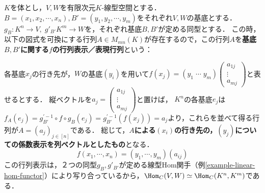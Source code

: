 \documentclass[uplatex, dvipdfmx]{jsreport}
\begin{document}
\begin{definition}
    $K$を体とし，$V,W$を有限次元$K$-線型空間とする．$B=(x_1,x_2,\cdots,x_n), B'=(y_1,y_2,\cdots,y_m)$をそれぞれ$V,W$の基底とする．$g_B:K^n\longrightarrow V,\; g'_{B'}K^m\longrightarrow W$を，それぞれ基底$B,B'$が定める同型とする．
    この時，以下の図式を可換にする行列$A\in M_{mn}(K)$が存在するので，この行列$A$を\textbf{基底$B,B'$に関する$f$の行列表示／表現行列}という：
    \begin{center}\end{center}
\end{definition}
\begin{remarks}[行列表示は列ベクトルでみる]
    各基底$x_j$の行き先が，$W$の基底$(y_i)$を用いて$f(x_j)=(y_1\;\cdots\;y_m)\begin{pmatrix}a_{1j}\\\vdots\\a_{mj}\end{pmatrix}$と表せるとする．
    縦ベクトルを$a_j=\begin{pmatrix}a_{1j}\\\vdots\\a_{mj}\end{pmatrix}$と置けば，
    $K^n$の各基底$e_j$は$f_A(e_j)=g^{'-1}_{B'}\circ f\circ g_B(e_j)=g^{'-1}_{B'}(f(x_j))=a_j$より，これらを並べて得る行列が$A=(a_j)_{j\in[n]}$である．
    総じて，\textbf{$A$による$(x_i)$の行き先の，$(y_j)$についての係数表示を列ベクトルとしたもの}となる．
    \[f(x_1,\cdots,x_n)=(y_1,\cdots,y_m)(a_{ij})\]
    この行列表示は，２つの同型$g_B,g'_{B'}$が定める線型Hom関手（例\ref{example-linear-hom-functor}）により写り合っているから，$\Hom_C(V,W)\simeq\Hom_C(K^n,K^m)$である．
\end{remarks}
\end{document}
